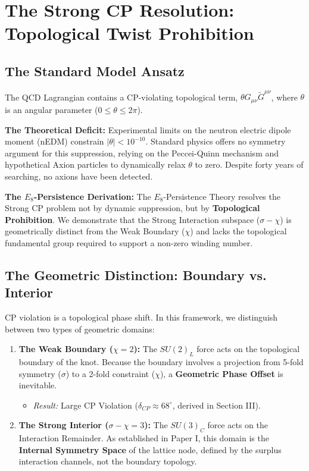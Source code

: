\section{The Strong CP Resolution: Topological Twist Prohibition}
\label{sec:StrongCP}

\subsection{The Standard Model Ansatz}
The QCD Lagrangian contains a CP-violating topological term, $\theta G_{\mu\nu} \tilde{G}^{\mu\nu}$, where $\theta$ is an angular parameter ($0 \le \theta \le 2\pi$). 

\textbf{The Theoretical Deficit:} Experimental limits on the neutron electric dipole moment (nEDM) constrain $|\theta| < 10^{-10}$. Standard physics offers no symmetry argument for this suppression, relying on the Peccei-Quinn mechanism and hypothetical Axion particles to dynamically relax $\theta$ to zero. Despite forty years of searching, no axions have been detected.

\textbf{The $E_8$-Persistence Derivation:} The $E_8$-Persistence Theory resolves the Strong CP problem not by dynamic suppression, but by \textbf{Topological Prohibition}. We demonstrate that the Strong Interaction subspace ($\sigma - \chi$) is geometrically distinct from the Weak Boundary ($\chi$) and lacks the topological fundamental group required to support a non-zero winding number.

\subsection{The Geometric Distinction: Boundary vs. Interior}
CP violation is a topological phase shift. In this framework, we distinguish between two types of geometric domains:

\begin{enumerate}
    \item \textbf{The Weak Boundary ($\chi=2$):} The $SU(2)_L$ force acts on the topological boundary of the knot. Because the boundary involves a projection from 5-fold symmetry ($\sigma$) to a 2-fold constraint ($\chi$), a \textbf{Geometric Phase Offset} is inevitable.
    \begin{itemize}
        \item \textit{Result:} Large CP Violation ($\delta_{CP} \approx 68^\circ$, derived in Section III).
    \end{itemize}
    \item \textbf{The Strong Interior ($\sigma - \chi = 3$):} The $SU(3)_C$ force acts on the Interaction Remainder. As established in Paper I, this domain is the \textbf{Internal Symmetry Space} of the lattice node, defined by the surplus interaction channels, not the boundary topology.
\end{enumerate}

